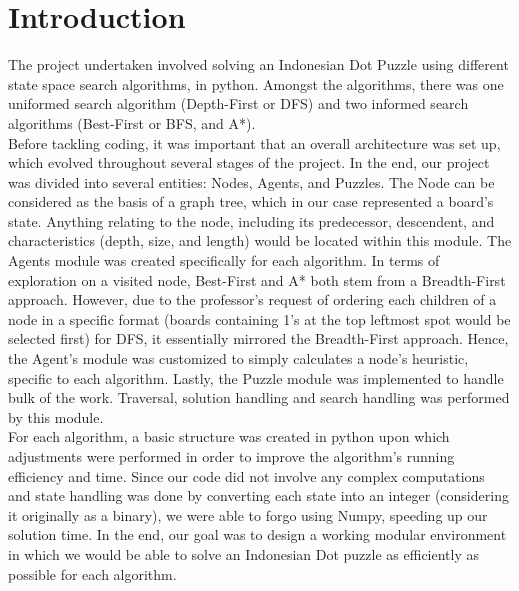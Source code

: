 \section{Introduction}

The project undertaken involved solving an Indonesian Dot Puzzle using different state space search algorithms, in python. Amongst the algorithms, there was one uniformed search algorithm (Depth-First or DFS) and two informed search algorithms (Best-First or BFS, and A*). 
\\

Before tackling coding, it was important that an overall architecture was set up, which evolved throughout several stages of the project. In the end, our project was divided into several entities: Nodes, Agents, and Puzzles. The Node can be considered as the basis of a graph tree, which in our case represented a board’s state. Anything relating to the node, including its predecessor, descendent, and characteristics (depth, size, and length) would be located within this module. The Agents module was created specifically for each algorithm. In terms of exploration on a visited node, Best-First and A* both stem from a Breadth-First approach. However, due to the professor’s request of ordering each children of a node in a specific format (boards containing 1’s at the top leftmost spot would be selected first) for DFS, it essentially mirrored the Breadth-First approach. Hence, the Agent’s module was customized to simply calculates a node’s heuristic, specific to each algorithm.  Lastly, the Puzzle module was implemented to handle bulk of the work. Traversal, solution handling and search handling was performed by this module.
\\

For each algorithm, a basic structure was created in python upon which adjustments were performed in order to improve the algorithm’s running efficiency and time. Since our code did not involve any complex computations and state handling was done by converting each state into an integer (considering it originally as a binary), we were able to forgo using Numpy, speeding up our solution time. In the end, our goal was to design a working modular environment in which we would be able to solve an Indonesian Dot puzzle as efficiently as possible for each algorithm.
